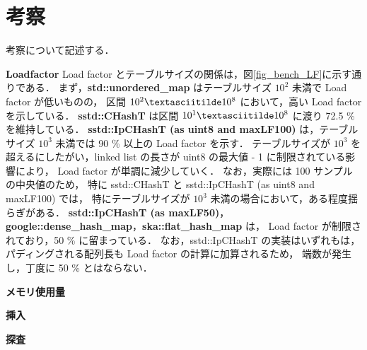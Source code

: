 \chapter{考察}
\label{chap_Discussion}

考察について記述する．
\leavevmode \newline

%
{\bf Loadfactor}
\samepage\newline\indent
Load factor とテーブルサイズの関係は，図\ref{fig_bench_LF}に示す通りである．
まず，{\bf std::unordered\_map} はテーブルサイズ $10^2$ 未満で Load factor が低いものの，
区間 $10^2\textasciitilde 10^8$ において，高い Load factor を示している．
{\bf sstd::CHashT} は区間 $10^1\textasciitilde 10^8$ に渡り 72.5 \% を維持している．
{\bf sstd::IpCHashT (as uint8 and maxLF100)} は，テーブルサイズ $10^3$ 未満では 90 \% 以上の Load factor を示す．
テーブルサイズが $10^3$ を超えるにしたがい，linked list の長さが uint8 の最大値 - 1 に制限されている影響により，
Load factor が単調に減少していく．
なお，実際には 100 サンプルの中央値のため，
特に sstd::CHashT と sstd::IpCHashT (as uint8 and maxLF100) では，
特にテーブルサイズが $10^3$ 未満の場合において，ある程度揺らぎがある．
{\bf sstd::IpCHashT (as maxLF50)}，{\bf google::dense\_hash\_map}，{\bf ska::flat\_hash\_map} は，
Load factor が制限されており，50 \% に留まっている．
なお，sstd::IpCHashT の実装はいずれもは，パディングされる配列長も Load factor の計算に加算されるため，
端数が発生し，丁度に 50 \% とはならない．
\leavevmode \newline

%
{\bf メモリ使用量}
\samepage\newline\indent
\leavevmode \newline

%
{\bf 挿入}
\samepage\newline\indent
\leavevmode \newline

%
{\bf 探査}
\samepage\newline\indent
\leavevmode \newline

